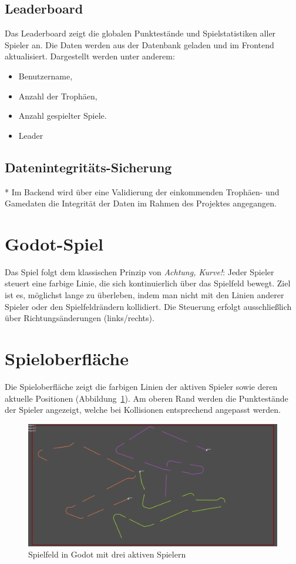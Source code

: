 \subsection{Leaderboard}
Das Leaderboard zeigt die globalen Punktestände und Spielstatistiken aller Spieler an.  
Die Daten werden aus der Datenbank geladen und im Frontend aktualisiert.  
Dargestellt werden unter anderem:
\begin{itemize}
  \item Benutzername,
  \item Anzahl der Trophäen,
  \item Anzahl gespielter Spiele.
  \item Leader
\end{itemize}
\subsection{Datenintegritäts-Sicherung}*
Im Backend wird über eine Validierung der einkommenden Trophäen- und Gamedaten die Integrität der Daten im Rahmen des Projektes angegangen.



\section{Godot-Spiel}
\label{chap:godot}

Das Spiel folgt dem klassischen Prinzip von \textit{Achtung, Kurve!}:  
Jeder Spieler steuert eine farbige Linie, die sich kontinuierlich über das Spielfeld bewegt.  
Ziel ist es, möglichst lange zu überleben, indem man nicht mit den Linien anderer Spieler oder den Spielfeldrändern kollidiert.  
Die Steuerung erfolgt ausschließlich über Richtungsänderungen (links/rechts).

\section{Spieloberfläche}
Die Spieloberfläche zeigt die farbigen Linien der aktiven Spieler sowie deren aktuelle Positionen (Abbildung~\ref{fig:godot_game}).  
Am oberen Rand werden die Punktestände der Spieler angezeigt, welche bei Kollisionen entsprechend angepasst werden.


\begin{figure}[h!]
  \centering
  \includegraphics[width=1\linewidth]{../images/game.png}
  \caption{Spielfeld in Godot mit drei aktiven Spielern}
  \label{fig:godot_game}
\end{figure}
 
